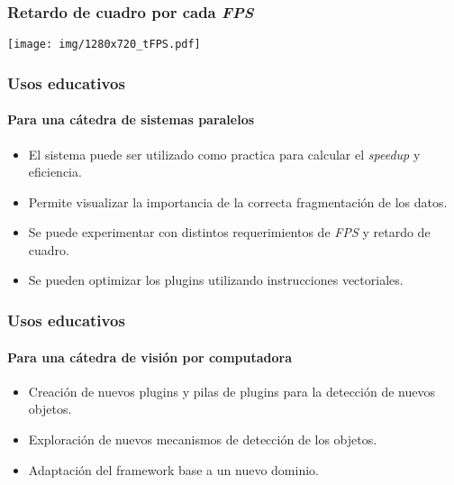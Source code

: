 \documentclass[11pt,a4paper,spanish]{beamer}
\begin{document}
\begin{frame}

\frametitle{Retardo de cuadro por cada \emph{FPS}}

\texttt{[image: img/1280x720\_tFPS.pdf]}

\end{frame}

\begin{frame}

\frametitle{Usos educativos}

\framesubtitle{Para una cátedra de sistemas paralelos}

\begin{itemize}

	\item El sistema puede ser utilizado como practica para calcular el
		\emph{speedup} y eficiencia.
	
	\item Permite visualizar la importancia de la correcta fragmentación de
		los datos.

	\item Se puede experimentar con distintos requerimientos de \emph{FPS} y
		retardo de cuadro.

	\item Se pueden optimizar los plugins utilizando instrucciones
		vectoriales.

\end{itemize}

\end{frame}

\begin{frame}

\frametitle{Usos educativos}

\framesubtitle{Para una cátedra de visión por computadora}

\begin{itemize}

	\item Creación de nuevos plugins y pilas de plugins para la detección de
		nuevos objetos.

	\item Exploración de nuevos mecanismos de detección de los objetos.

	\item Adaptación del framework base a un nuevo dominio.

\end{itemize}

\end{frame}
\end{document}
